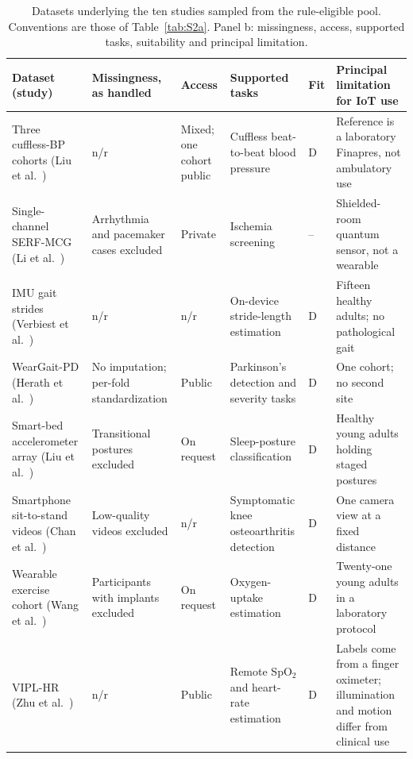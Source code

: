\documentclass[journal]{IEEEtran}
\renewcommand{\thetable}{S\arabic{table}}
\begin{document}
\begin{table}[tbp]
\centering
\addtocounter{table}{-1}
\renewcommand{\thetable}{S4b}
\caption{Datasets underlying the ten studies sampled from the rule-eligible pool. Conventions are
those of Table~\ref{tab:S2a}. Panel b: missingness, access, supported tasks, suitability and principal limitation.}
\label{tab:S4b}
\footnotesize
\setlength{\tabcolsep}{2.5pt}
\renewcommand{\arraystretch}{1.05}
\begin{tabularx}{\textwidth}{L{2.5cm} L{3.4cm} L{2.2cm} L{2.9cm} L{0.75cm} X}
\toprule
\textbf{Dataset (study)} & \textbf{Missingness, as handled} & \textbf{Access} & \textbf{Supported tasks} & \textbf{Fit} & \textbf{Principal limitation for IoT use} \\
\midrule
Three cuffless-BP cohorts (Liu et al.~\cite{liu2024cignn}) & n/r & Mixed; one cohort public & Cuffless beat-to-beat blood pressure & D & Reference is a laboratory Finapres, not ambulatory use \\
\addlinespace[1pt]
Single-channel SERF-MCG (Li et al.~\cite{li2026edgeischemia}) & Arrhythmia and pacemaker cases excluded & Private & Ischemia screening & -- & Shielded-room quantum sensor, not a wearable \\
\addlinespace[1pt]
IMU gait strides (Verbiest et al.~\cite{verbiest2023gaitstride}) & n/r & n/r & On-device stride-length estimation & D & Fifteen healthy adults; no pathological gait \\
\addlinespace[1pt]
WearGait-PD (Herath et al.~\cite{herath2026parkinson}) & No imputation; per-fold standardization & Public & Parkinson's detection and severity tasks & D & One cohort; no second site \\
\addlinespace[1pt]
Smart-bed accelerometer array (Liu et al.~\cite{liu2025sleepposture}) & Transitional postures excluded & On request & Sleep-posture classification & D & Healthy young adults holding staged postures \\
\addlinespace[1pt]
Smartphone sit-to-stand videos (Chan et al.~\cite{chan2026sitstand}) & Low-quality videos excluded & n/r & Symptomatic knee osteoarthritis detection & D & One camera view at a fixed distance \\
\addlinespace[1pt]
Wearable exercise cohort (Wang et al.~\cite{wang2025vo2}) & Participants with implants excluded & On request & Oxygen-uptake estimation & D & Twenty-one young adults in a laboratory protocol \\
\addlinespace[1pt]
VIPL-HR (Zhu et al.~\cite{zhu2024ippg}) & n/r & Public & Remote SpO$_2$ and heart-rate estimation & D & Labels come from a finger oximeter; illumination and motion differ from clinical use \\

\end{tabularx}
\end{table}
\end{document}

